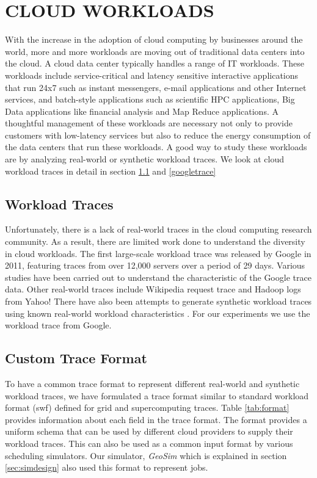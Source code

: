 \documentclass[conference,12pt]{IEEEtran}
\begin{document}
\fi





\section{CLOUD WORKLOADS } \label{cloudworkload}
With the increase in the adoption of cloud computing by businesses around the world, more and more workloads are moving out of traditional data centers into the cloud. A cloud data center typically handles a range of IT workloads. These workloads include service-critical and latency sensitive interactive applications that run 24x7 such as instant messengers, e-mail applications and other Internet services, and batch-style applications such as scientific HPC applications, Big Data applications like financial analysis and Map Reduce applications. A thoughtful management of these workloads are necessary not only to provide customers with low-latency services but also to reduce the energy consumption of the data centers that run these workloads. A good way to study these workloads are by analyzing real-world or synthetic workload traces. We look at cloud workload traces in detail in section \ref{traces} and \ref{googletrace}

\subsection{Workload Traces} \label{traces}
Unfortunately, there is a lack of real-world traces in the cloud computing research community. As a result, there are limited work done to understand the diversity in cloud workloads. The first large-scale workload trace was released by Google in 2011\cite{googletracedata}, featuring traces from over 12,000 servers over a period of 29 days. Various studies have been carried out to understand the characteristic of the Google trace data. Other real-world traces include Wikipedia request trace \cite{urdaneta2009wikipedia} and Hadoop logs from Yahoo! \cite{yahootrace}There have also been attempts to generate synthetic workload traces using known real-world workload characteristics \cite{beitch2010rain} \cite{wang2011towards}. For our experiments we use the workload trace from Google. 

\subsection{Custom Trace Format}
To have a common trace format to represent different real-world and synthetic workload traces, we have formulated a trace format similar to standard workload format (swf) \cite{chapin1999benchmarks} defined for grid and supercomputing traces. Table \ref{tab:format} provides information about each field in the trace format. The format provides a uniform schema that can be used by different cloud providers to supply their workload traces. This can also be used as a common input format by various scheduling simulators. Our simulator, \textit{GeoSim} which is explained in section \ref{sec:simdesign} also used this format to represent jobs.
 
\end{document}
